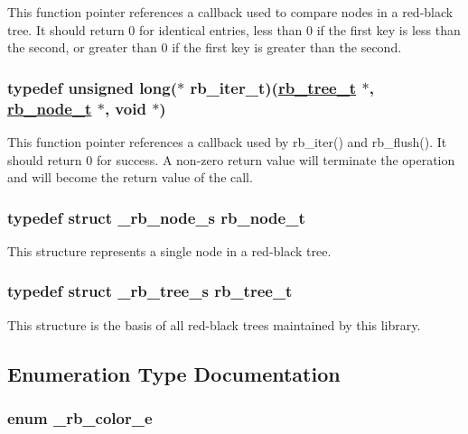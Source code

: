 This function pointer references a callback used to compare nodes in a red-black tree. It should return 0 for identical entries, less than 0 if the first key is less than the second, or greater than 0 if the first key is greater than the second. \hypertarget{group__dbprim__rbtree_a2}{
\subsubsection[rb\_\-iter\_\-t]{\setlength{\rightskip}{0pt plus 5cm}typedef unsigned long($\ast$ rb\_\-iter\_\-t)(\hyperlink{group__dbprim__rbtree_a0}{rb\_\-tree\_\-t} $\ast$, \hyperlink{group__dbprim__rbtree_a1}{rb\_\-node\_\-t} $\ast$, void $\ast$)}}
\label{group__dbprim__rbtree_a2}


This function pointer references a callback used by rb\_\-iter() and rb\_\-flush(). It should return 0 for success. A non-zero return value will terminate the operation and will become the return value of the call. \hypertarget{group__dbprim__rbtree_a1}{
\subsubsection[rb\_\-node\_\-t]{\setlength{\rightskip}{0pt plus 5cm}typedef struct \_\-rb\_\-node\_\-s rb\_\-node\_\-t}}
\label{group__dbprim__rbtree_a1}


This structure represents a single node in a red-black tree. \hypertarget{group__dbprim__rbtree_a0}{
\subsubsection[rb\_\-tree\_\-t]{\setlength{\rightskip}{0pt plus 5cm}typedef struct \_\-rb\_\-tree\_\-s rb\_\-tree\_\-t}}
\label{group__dbprim__rbtree_a0}


This structure is the basis of all red-black trees maintained by this library. 

\subsection{Enumeration Type Documentation}
\hypertarget{group__dbprim__rbtree_a38}{
\subsubsection[\_\-rb\_\-color\_\-e]{\setlength{\rightskip}{0pt plus 5cm}enum \_\-rb\_\-color\_\-e}}
\label{group__dbprim__rbtree_a38}


